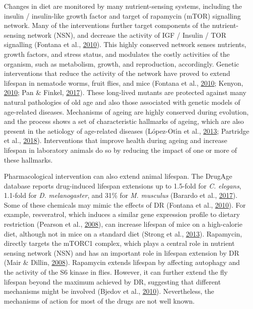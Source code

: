 \documentclass[12pt,twoside]{unicam}
\begin{document}
Changes in diet are monitored by many nutrient-sensing systems, including the insulin / insulin-like growth factor and target of rapamycin (mTOR) signalling network. Many of the interventions further target components of the nutrient-sensing network (NSN), and decrease the activity of IGF / Insulin / TOR signalling (Fontana et al., \protect\hyperlink{ref-Fontana2010}{2010}). This highly conserved network senses nutrients, growth factors, and stress status, and modulates the costly activities of the organism, such as metabolism, growth, and reproduction, accordingly. Genetic interventions that reduce the activity of the network have proved to extend lifespan in nematode worms, fruit flies, and mice (Fontana et al., \protect\hyperlink{ref-Fontana2010}{2010}; Kenyon, \protect\hyperlink{ref-Kenyon2010}{2010}; Pan \& Finkel, \protect\hyperlink{ref-Pan2017}{2017}). These long-lived mutants are protected against many natural pathologies of old age and also those associated with genetic models of age-related diseases. Mechanisms of ageing are highly conserved during evolution, and the process shows a set of characteristic hallmarks of ageing, which are also present in the aetiology of age-related diseases (López-Otı́n et al., \protect\hyperlink{ref-Lopez-Otin2013}{2013}; Partridge et al., \protect\hyperlink{ref-Partridge2018}{2018}). Interventions that improve health during ageing and increase lifespan in laboratory animals do so by reducing the impact of one or more of these hallmarks.

Pharmacological intervention can also extend animal lifespan. The DrugAge database reports drug-induced lifespan extensions up to 1.5-fold for \emph{C. elegans}, 1.1-fold for \emph{D. melanogaster}, and 31\% for \emph{M. musculus} (Barardo et al., \protect\hyperlink{ref-Barardo2017}{2017}). Some of these chemicals may mimic the effects of DR (Fontana et al., \protect\hyperlink{ref-Fontana2010}{2010}). For example, resveratrol, which induces a similar gene expression profile to dietary restriction (Pearson et al., \protect\hyperlink{ref-Pearson2008}{2008}), can increase lifespan of mice on a high-calorie diet, although not in mice on a standard diet (Strong et al., \protect\hyperlink{ref-Strong2013}{2013}). Rapamycin, directly targets the mTORC1 complex, which plays a central role in nutrient sensing network (NSN) and has an important role in lifespan extension by DR (Mair \& Dillin, \protect\hyperlink{ref-Mair2008}{2008}). Rapamycin extends lifespan by affecting autophagy and the activity of the S6 kinase in flies. However, it can further extend the fly lifespan beyond the maximum achieved by DR, suggesting that different mechanisms might be involved (Bjedov et al., \protect\hyperlink{ref-Bjedov2010}{2010}). Nevertheless, the mechanisms of action for most of the drugs are not well known.
\end{document}
